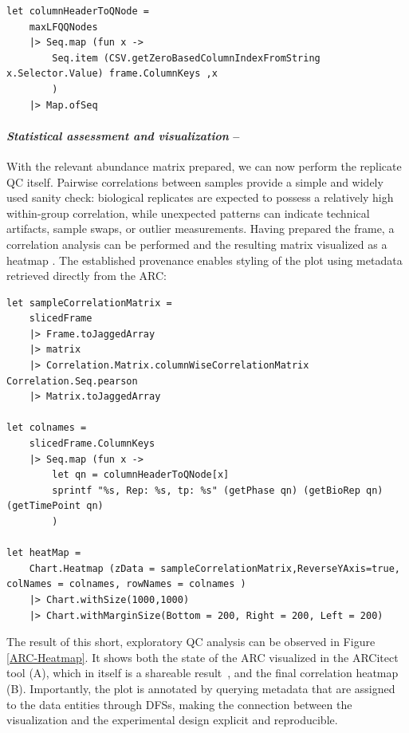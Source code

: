 \documentclass{jib}
\begin{document}
\begin{verbatim}
let columnHeaderToQNode = 
    maxLFQQNodes
    |> Seq.map (fun x -> 
        Seq.item (CSV.getZeroBasedColumnIndexFromString x.Selector.Value) frame.ColumnKeys ,x
        )
    |> Map.ofSeq
\end{verbatim}

\paragraph{\emph{Statistical assessment and visualization} –}

With the relevant abundance matrix prepared, we can now perform the replicate QC itself. Pairwise correlations between samples provide a simple and widely used sanity check: biological replicates are expected to possess a relatively high within-group correlation, while unexpected patterns can indicate technical artifacts, sample swaps, or outlier measurements. Having prepared the frame, a correlation analysis can be performed and the resulting matrix visualized as a heatmap \cite{schneider2022plotlynet}. The established provenance enables styling of the plot using metadata retrieved directly from the ARC:

\begin{verbatim}
let sampleCorrelationMatrix = 
    slicedFrame 
    |> Frame.toJaggedArray 
    |> matrix 
    |> Correlation.Matrix.columnWiseCorrelationMatrix Correlation.Seq.pearson 
    |> Matrix.toJaggedArray

let colnames = 
    slicedFrame.ColumnKeys
    |> Seq.map (fun x -> 
        let qn = columnHeaderToQNode[x]
        sprintf "%s, Rep: %s, tp: %s" (getPhase qn) (getBioRep qn)  (getTimePoint qn)
        )

let heatMap = 
    Chart.Heatmap (zData = sampleCorrelationMatrix,ReverseYAxis=true, colNames = colnames, rowNames = colnames )
    |> Chart.withSize(1000,1000)
    |> Chart.withMarginSize(Bottom = 200, Right = 200, Left = 200)
\end{verbatim}

The result of this short, exploratory QC analysis can be observed in Figure \ref{ARC-Heatmap}. It shows both the state of the ARC visualized in the ARCitect tool (A), which in itself is a shareable result~\cite{zhang2023ruchlamy}, and the final correlation heatmap (B). Importantly, the plot is annotated by querying metadata that are assigned to the data entities through DFSs, making the connection between the visualization and the experimental design explicit and reproducible.
\end{document}
